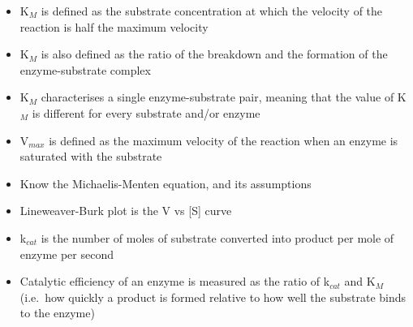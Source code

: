 \begin{itemize}
	\item K$_M$ is defined as the substrate concentration at which the velocity of the reaction is half the maximum velocity
	\item K$_M$ is also defined as the ratio of the breakdown and the formation of the enzyme-substrate complex
	\item K$_M$ characterises a single enzyme-substrate pair, meaning that the value of K$_M$ is different for every substrate and/or enzyme
	\item V$_{max}$ is defined as the maximum velocity of the reaction when an enzyme is saturated with the substrate
	\item Know the Michaelis-Menten equation, and its assumptions
	\item Lineweaver-Burk plot is the V vs [S] curve
	\item k$_{cat}$ is the number of moles of substrate converted into product per mole of enzyme per second
	\item Catalytic efficiency of an enzyme is measured as the ratio of k$_{cat}$ and K$_M$ (i.e.\ how quickly a product is formed relative to how well the substrate binds to the enzyme)
\end{itemize}
